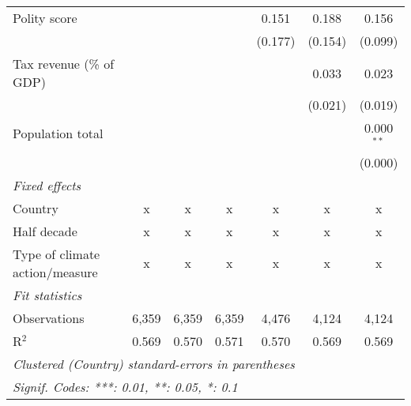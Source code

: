 \begin{tabular}{lcccccc}
   Polity score                                                    &         &                &                & 0.151          & 0.188          & 0.156\\   
                                                                   &         &                &                & (0.177)        & (0.154)        & (0.099)\\   
   Tax revenue (\% of GDP)                                         &         &                &                &                & 0.033          & 0.023\\   
                                                                   &         &                &                &                & (0.021)        & (0.019)\\   
   Population total                                                &         &                &                &                &                & 0.000$^{**}$\\   
                                                                   &         &                &                &                &                & (0.000)\\   
   \emph{Fixed effects}\\
   Country                                                         & x       & x              & x              & x              & x              & x\\  
   Half decade                                                     & x       & x              & x              & x              & x              & x\\  
   Type of climate action/measure                                  & x       & x              & x              & x              & x              & x\\  
   \midrule \emph{Fit statistics}\\
   Observations                                                    & 6,359   & 6,359          & 6,359          & 4,476          & 4,124          & 4,124\\  
   R$^2$                                                           & 0.569   & 0.570          & 0.571          & 0.570          & 0.569          & 0.569\\  
   \midrule
   \multicolumn{7}{l}{\emph{Clustered (Country) standard-errors in parentheses}}\\
   \multicolumn{7}{l}{\emph{Signif. Codes: ***: 0.01, **: 0.05, *: 0.1}}\\
\end{tabular}
\par\endgroup


